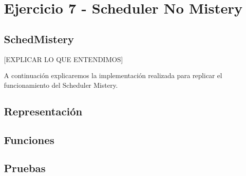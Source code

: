\section{Ejercicio 7 - Scheduler No Mistery}

\subsection{SchedMistery} 

[EXPLICAR LO QUE ENTENDIMOS]

A continuación explicaremos la implementación realizada para replicar el funcionamiento del Scheduler Mistery.

\subsection{Representación}

\subsection{Funciones}

\subsection{Pruebas}